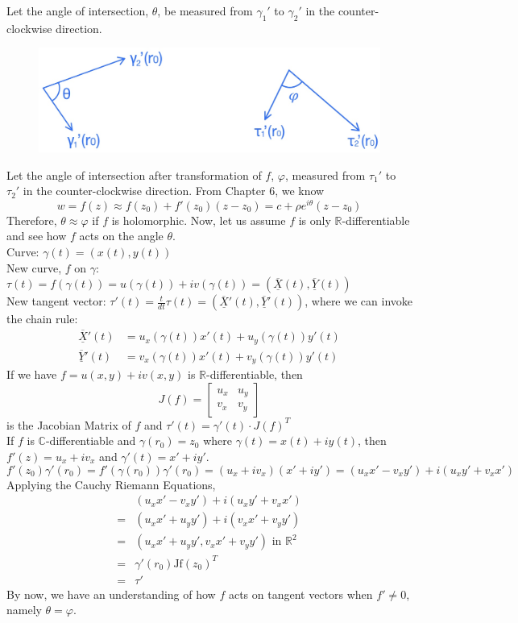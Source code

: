 \documentclass[11pt]{article}
\begin{document}
Let the angle of intersection, $\theta$, be measured from $\gamma_1'$ to $\gamma_2'$ in the counter-clockwise direction. 
\begin{figure}[H]
\includegraphics[scale = 0.25]{9_5}
\centering
\end{figure}
Let the angle of intersection after transformation of $f$, $\varphi$, measured from $\tau_1'$ to $\tau_2'$ in the counter-clockwise direction. From Chapter 6, we know 
$$w = f(z) \approx f(z_0) + f'(z_0)(z - z_0) = c + \rho e^{i\theta}(z - z_0)$$
Therefore, $\theta \approx \varphi$ if $f$ is holomorphic. Now, let us assume $f$ is only $\mathbb{R}$-differentiable and see how $f$ acts on the angle $\theta$. \\
Curve: $\gamma(t) = (x(t), y(t))$ \\
New curve, $f$ on $\gamma$: $\tau(t) = f(\gamma(t)) = u(\gamma(t)) + iv(\gamma(t)) = (\overline{\underline {X}}(t), \overline{\underline {Y}}(t))$ \\
New tangent vector: $\tau'(t) = \frac{t}{dt}\tau(t) = (\overline{\underline {X}}'(t), \overline{\underline {Y}}'(t))$, where we can invoke the chain rule: 
\begin{align*}
\overline{\underline {X}}'(t) &= u_x(\gamma(t))x'(t) + u_y(\gamma(t))y'(t) \\ 
\overline{\underline {Y}}'(t) &= v_x(\gamma(t))x'(t) + v_y(\gamma(t))y'(t)
\end{align*}
If we have $f = u(x, y) + iv(x, y)$ is $\mathbb{R}$-differentiable, then 
\begin{equation*}
J(f) = 
\begin{bmatrix}
 u_x & u_y \\
 v_x & v_y
\end{bmatrix}
\end{equation*}
is the Jacobian Matrix of $f$ and $\tau'(t) = \gamma'(t) \cdot J(f)^T$ \\
If $f$ is $\mathbb{C}$-differentiable and $\gamma(r_0) = z_0$ where $\gamma(t) = x(t) + iy(t)$, then $f'(z) = u_x + iv_x$ and $\gamma'(t) = x' + iy'$. 
$$f'(z_0)\gamma'(r_0) = f'(\gamma(r_0))\gamma'(r_0) = (u_x + iv_x)(x' + iy') = (u_xx' - v_xy') + i(u_xy' + v_xx')$$
Applying the Cauchy Riemann Equations, 
\begin{align*}
&(u_xx' - v_xy') + i(u_xy' + v_xx') \\
=& (u_xx' + u_yy') + i(v_xx' + v_yy') \\
=& (u_xx' + u_yy', v_xx' + v_yy') \mbox{ in } \mathbb{R}^2  \\
=& \gamma'(r_0) \text{Jf}(z_0)^T \\
=& \tau'
\end{align*}
By now, we have an understanding of how $f$ acts on tangent vectors when $f' \neq 0$, namely $\theta = \varphi$.
\end{document}
